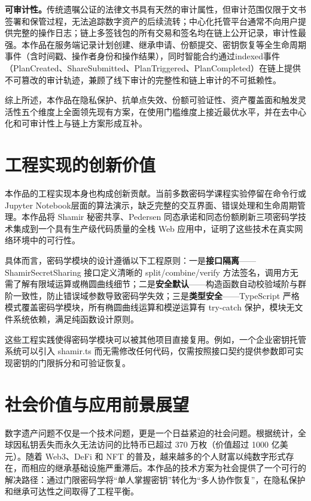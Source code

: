 \documentclass[UTF8,a4paper,zihao=-4,openany]{ctexrep}
\begin{document}
\textbf{可审计性。}传统遗嘱公证的法律文书具有天然的审计属性，但审计范围仅限于文书签署和保管过程，无法追踪数字资产的后续流转；中心化托管平台通常不向用户提供完整的操作日志；链上多签钱包的所有交易和签名均在链上公开记录，审计性最强。本作品在服务端记录计划创建、继承申请、份额提交、密钥恢复等全生命周期事件（含时间戳、操作者身份和操作结果），同时智能合约通过indexed事件（PlanCreated、ShareSubmitted、PlanTriggered、PlanCompleted）在链上提供不可篡改的审计轨迹，兼顾了线下审计的完整性和链上审计的不可抵赖性。

综上所述，本作品在隐私保护、抗单点失效、份额可验证性、资产覆盖面和触发灵活性五个维度上全面领先现有方案，在使用门槛维度上接近最优水平，并在去中心化和可审计性上与链上方案形成互补。

\section{工程实现的创新价值}

本作品的工程实现本身也构成创新贡献。当前多数密码学课程实验停留在命令行或Jupyter Notebook层面的算法演示，缺乏完整的交互界面、错误处理和生命周期管理。本作品将 Shamir 秘密共享、Pedersen 同态承诺和同态份额刷新三项密码学技术集成到一个具有生产级代码质量的全栈 Web 应用中，证明了这些技术在真实网络环境中的可行性。

具体而言，密码学模块的设计遵循以下工程原则：一是\textbf{接口隔离}——ShamirSecretSharing 接口定义清晰的 split/combine/verify 方法签名，调用方无需了解有限域运算或椭圆曲线细节；二是\textbf{安全默认}——构造函数自动校验域阶与群阶一致性，防止错误域参数导致密码学失效；三是\textbf{类型安全}——TypeScript 严格模式覆盖密码学模块，所有椭圆曲线运算和模逆运算有 try-catch 保护，模块无文件系统依赖，满足纯函数设计原则。

这些工程实践使得密码学模块可以被其他项目直接复用。例如，一个企业密钥托管系统可以引入 shamir.ts 而无需修改任何代码，仅需按照接口契约提供参数即可实现密钥的门限拆分和可验证恢复。

\section{社会价值与应用前景展望}

数字遗产问题不仅是一个技术问题，更是一个日益紧迫的社会问题。根据统计，全球因私钥丢失而永久无法访问的比特币已超过 370 万枚（价值超过 1000 亿美元）。随着 Web3、DeFi 和 NFT 的普及，越来越多的个人财富以纯数字形式存在，而相应的继承基础设施严重滞后。本作品的技术方案为社会提供了一个可行的解决路径：通过门限密码学将“单人掌握密钥”转化为“多人协作恢复”，在隐私保护和继承可达性之间取得了工程平衡。
\end{document}
